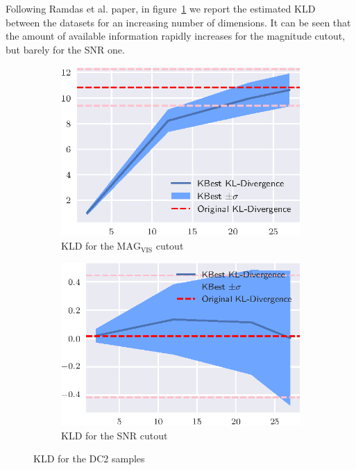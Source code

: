 Following Ramdas et al. paper, in figure~\ref{fig:divergence_dc2} we report
the estimated \gls{KLD}~\cite{perez2008kullback} between the datasets for an
increasing number of dimensions. It can be seen that the amount of available information
rapidly increases for the magnitude cutout, but barely for the SNR one.

\begin{figure}[htbp]
    \begin{subfigure}[]{0.5\textwidth}
    \includegraphics[width=\textwidth]{images/6_som/divergence/dc2_mag_divergence.eps}
    \caption{\gls{KLD} for the $\text{MAG}_\text{VIS}$ cutout}
    \end{subfigure}
    \hfill
    \begin{subfigure}[]{0.5\textwidth}
    \includegraphics[width=\textwidth]{images/6_som/divergence/dc2_snr_divergence.eps}
    \caption{\gls{KLD} for the SNR cutout}
    \end{subfigure}
    \caption{\gls{KLD} for the DC2 samples}
    \label{fig:divergence_dc2}
\end{figure}

